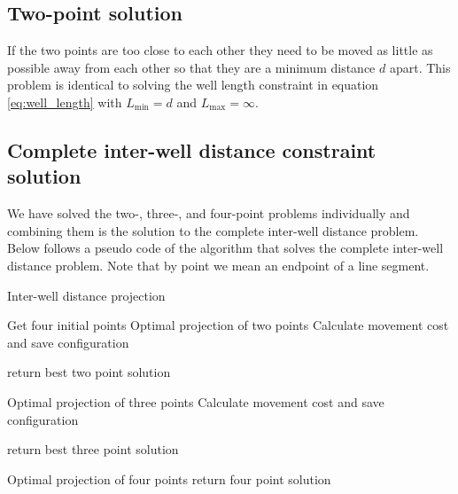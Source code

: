 \subsection{Two-point solution}
%
If the two points are too close to each other they need to be moved
as little as possible away from each other so that they are a minimum
distance $d$ apart. This problem is identical to solving the well length 
constraint in equation \eqref{eq:well_length} with $L_{\min} = d$ and
$L_{\max} = \infty$.
%
\subsection{Complete inter-well distance constraint solution}
%
We have solved the two-, three-, and four-point problems individually and
combining them is the solution to the complete inter-well distance problem.
Below follows a pseudo code of the algorithm that solves the complete
inter-well distance problem. Note that by point we mean an endpoint of
a line segment.
%
\begin{algorithm}[H]
\caption{Inter-well distance projection}\label{alg:interwell_distance}
\begin{algorithmic}[1]
\State Get four initial points
\State
{}
\State Optimal projection of two points
		\State Calculate movement cost and save configuration
	\EndIf
\EndFor

\State
{}
\State return best two point solution
\EndIf

\State
{}
\State Optimal projection of three points
		\State Calculate movement cost and save configuration
	\EndIf
\EndFor

\State
{}
\State return best three point solution
\EndIf
\State

\State Optimal projection of four points
\State return four point solution

\EndProcedure
\end{algorithmic}
\end{algorithm}
%
%